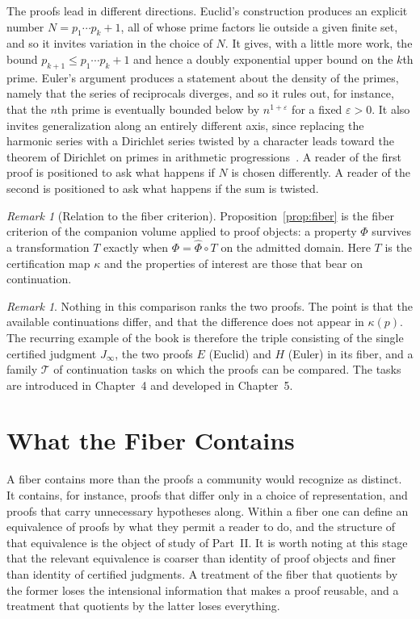 \documentclass[11pt]{book}
\theoremstyle{definition}
\theoremstyle{remark}
\newtheorem{remark}[theorem]{Remark}
\newcommand{\cert}{\kappa}
\begin{document}
The proofs lead in different directions. Euclid's construction produces an explicit number $N=p_1\cdots p_k+1$, all of whose prime factors lie outside a given finite set, and so it invites variation in the choice of $N$. It gives, with a little more work, the bound $p_{k+1}\le p_1\cdots p_k+1$ and hence a doubly exponential upper bound on the $k$th prime. Euler's argument produces a statement about the density of the primes, namely that the series of reciprocals diverges, and so it rules out, for instance, that the $n$th prime is eventually bounded below by $n^{1+\varepsilon}$ for a fixed $\varepsilon>0$. It also invites generalization along an entirely different axis, since replacing the harmonic series with a Dirichlet series twisted by a character leads toward the theorem of Dirichlet on primes in arithmetic progressions~\cite{dirichlet}. A reader of the first proof is positioned to ask what happens if $N$ is chosen differently. A reader of the second is positioned to ask what happens if the sum is twisted.

\begin{remark}[Relation to the fiber criterion]
Proposition~\ref{prop:fiber} is the fiber criterion of the companion volume applied to proof objects: a property $\Phi$ survives a transformation $T$ exactly when $\Phi=\widehat\Phi\circ T$ on the admitted domain. Here $T$ is the certification map $\cert$ and the properties of interest are those that bear on continuation.
\end{remark}

\begin{remark}
Nothing in this comparison ranks the two proofs. The point is that the available continuations differ, and that the difference does not appear in $\cert(p)$. The recurring example of the book is therefore the triple consisting of the single certified judgment $J_\infty$, the two proofs $E$ (Euclid) and $H$ (Euler) in its fiber, and a family $\mathcal T$ of continuation tasks on which the proofs can be compared. The tasks are introduced in Chapter~4 and developed in Chapter~5.
\end{remark}

\section{What the Fiber Contains}

A fiber contains more than the proofs a community would recognize as distinct. It contains, for instance, proofs that differ only in a choice of representation, and proofs that carry unnecessary hypotheses along. Within a fiber one can define an equivalence of proofs by what they permit a reader to do, and the structure of that equivalence is the object of study of Part~II. It is worth noting at this stage that the relevant equivalence is coarser than identity of proof objects and finer than identity of certified judgments. A treatment of the fiber that quotients by the former loses the intensional information that makes a proof reusable, and a treatment that quotients by the latter loses everything.
\end{document}
